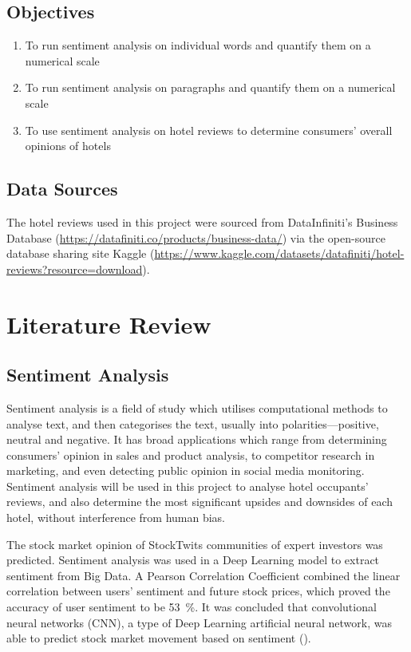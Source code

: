 \documentclass[
	fontsize=12pt,
	paper=a4,
	bibliography=totocnumbered
]{scrartcl}
\begin{document}
\subsection{Objectives}
\begin{enumerate}
	\item To run sentiment analysis on individual words and quantify them on a numerical scale
	\item To run sentiment analysis on paragraphs and quantify them on a numerical scale
	\item To use sentiment analysis on hotel reviews to determine consumers' overall opinions of hotels
\end{enumerate}

\subsection{Data Sources}

The hotel reviews used in this project were sourced from DataInfiniti's Business Database
(\url{https://datafiniti.co/products/business-data/}) via the open-source database sharing
site Kaggle (\url{https://www.kaggle.com/datasets/datafiniti/hotel-reviews?resource=download}).

\section{Literature Review}

\subsection{Sentiment Analysis}

Sentiment analysis is a field of study which utilises computational methods to analyse text,
and then categorises the text, usually into polarities---positive, neutral
and negative. It has broad applications which range from determining consumers' opinion in
sales and product analysis, to competitor research in marketing, and even detecting public
opinion in social media monitoring. Sentiment analysis will be used in this project to
analyse hotel occupants' reviews, and also determine the most significant upsides
and downsides of each hotel, without interference from human bias.

The stock market opinion of StockTwits communities
of expert investors was predicted. Sentiment analysis was used in a Deep Learning model to extract
sentiment from Big Data. A Pearson Correlation Coefficient combined the linear correlation
between users' sentiment and future stock prices, which
proved the accuracy of user sentiment to be \qty{53}{\percent}.
It was concluded that convolutional neural networks (CNN), a type of Deep Learning
artificial neural network, was able to predict stock market movement based on sentiment (\cite{stock}).
\end{document}
